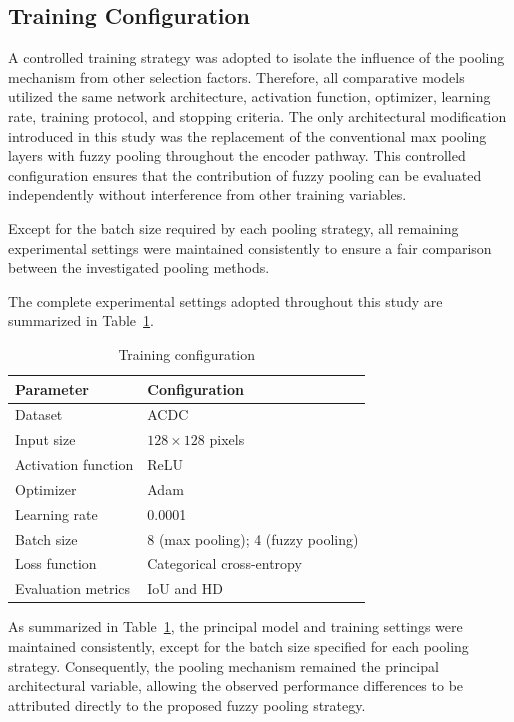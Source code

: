 \subsection{Training Configuration}
\label{subsec:ch4-training}

A controlled training strategy was adopted to isolate the influence of the pooling mechanism from other selection factors. Therefore, all comparative models utilized the same network architecture, activation function, optimizer, learning rate, training protocol, and stopping criteria. The only architectural modification introduced in this study was the replacement of the conventional max pooling layers with fuzzy pooling throughout the encoder pathway. This controlled configuration ensures that the contribution of fuzzy pooling can be evaluated independently without interference from other training variables.

Except for the batch size required by each pooling strategy, all remaining experimental settings were maintained consistently to ensure a fair comparison between the investigated pooling methods.

The complete experimental settings adopted throughout this study are summarized in Table~\ref{tab:ch4-training}.

\begin{table}[htbp]
	\centering
	\caption{Training configuration}
	\label{tab:ch4-training}
	\begin{tabularx}{0.88\textwidth}{p{} X}
		\toprule
		\textbf{Parameter} & \textbf{Configuration} \\
		\midrule
		Dataset & ACDC \\
		Input size & $128 \times 128$ pixels \\
		Activation function & ReLU \\
		Optimizer & Adam \\
		Learning rate & 0.0001 \\
		Batch size & 8 (max pooling); 4 (fuzzy pooling) \\
		Loss function & Categorical cross-entropy \\
		Evaluation metrics & IoU and HD \\
		\bottomrule
	\end{tabularx}
\end{table}

As summarized in Table~\ref{tab:ch4-training}, the principal model and training settings were maintained consistently, except for the batch size specified for each pooling strategy. Consequently, the pooling mechanism remained the principal architectural variable, allowing the observed performance differences to be attributed directly to the proposed fuzzy pooling strategy.

